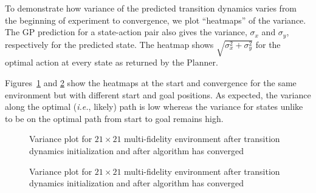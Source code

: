 \documentclass[12pt]{report}
\newcommand{\ie}{\textit{i.e.}}
\begin{document}
To demonstrate how variance of the predicted transition dynamics varies from the beginning of experiment to convergence, we plot ``heatmaps'' of the variance. The GP prediction for a state-action pair also gives the variance, $\sigma_x$ and $\sigma_y$, respectively for the predicted state. The heatmap shows $\sqrt{\sigma_x^2 + \sigma_y^2}$ for the optimal action at every state as returned by the Planner. 

Figures~\ref{fig:heatmap1} and \ref{fig:heatmap2} show the heatmaps at the start and convergence for the same environment but with different start and goal positions. As expected, the variance along the optimal (\ie, likely) path is low whereas the variance for states unlike to be on the optimal path from start to goal remains high. 

\begin{figure}
	\centering
	\caption{Variance plot for $21 \times 21$ multi-fidelity environment after transition dynamics initialization and after algorithm has converged}
   \label{fig:heatmap1}
\end{figure}

\begin{figure}[htp]
	\centering 
	\caption{Variance plot for $21 \times 21$ multi-fidelity environment after transition dynamics initialization and after algorithm has converged}
   \label{fig:heatmap2}
\end{figure}
\end{document}
